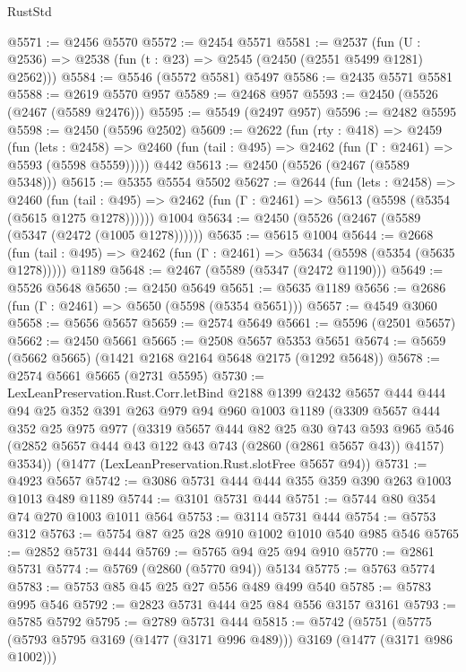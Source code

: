 \begin{lexlean}{RustStd}
\begin{coremodule}
@5571 := @2456 @5570
@5572 := @2454 @5571
@5581 := @2537 (fun (U : @2536) => @2538 (fun (t : @23) => @2545 (@2450 (@2551 @5499 @1281) @2562)))
@5584 := @5546 (@5572 @5581) @5497
@5586 := @2435 @5571 @5581
@5588 := @2619 @5570 @957
@5589 := @2468 @957
@5593 := @2450 (@5526 (@2467 (@5589 @2476)))
@5595 := @5549 (@2497 @957)
@5596 := @2482 @5595
@5598 := @2450 (@5596 @2502)
@5609 := @2622
    (fun (rty : @418) =>
    @2459
      (fun (lets : @2458) =>
      @2460 (fun (tail : @495) => @2462 (fun (Γ : @2461) => @5593 (@5598 @5559)))))
    @442
@5613 := @2450 (@5526 (@2467 (@5589 @5348)))
@5615 := @5355 @5554 @5502
@5627 := @2644
    (fun (lets : @2458) =>
    @2460
      (fun (tail : @495) => @2462 (fun (Γ : @2461) => @5613 (@5598 (@5354 (@5615 @1275 @1278))))))
    @1004
@5634 := @2450 (@5526 (@2467 (@5589 (@5347 (@2472 (@1005 @1278))))))
@5635 := @5615 @1004
@5644 := @2668
    (fun (tail : @495) => @2462 (fun (Γ : @2461) => @5634 (@5598 (@5354 (@5635 @1278)))))
    @1189
@5648 := @2467 (@5589 (@5347 (@2472 @1190)))
@5649 := @5526 @5648
@5650 := @2450 @5649
@5651 := @5635 @1189
@5656 := @2686 (fun (Γ : @2461) => @5650 (@5598 (@5354 @5651)))
@5657 := @4549 @3060
@5658 := @5656 @5657
@5659 := @2574 @5649
@5661 := @5596 (@2501 @5657)
@5662 := @2450 @5661
@5665 := @2508 @5657 @5353 @5651
@5674 := @5659 (@5662 @5665) (@1421 @2168 @2164 @5648 @2175 (@1292 @5648))
@5678 := @2574 @5661 @5665 (@2731 @5595)
@5730 := LexLeanPreservation.Rust.Corr.letBind
    @2188
    @1399
    @2432
    @5657
    @444
    @444
    @94
    @25
    @352
    @391
    @263
    @979
    @94
    @960
    @1003
    @1189
    (@3309
      @5657
      @444
      @352
      @25
      @975
      @977
      (@3319
        @5657
        @444
        @82
        @25
        @30
        @743
        @593
        @965
        @546
        (@2852 @5657 @444 @43 @122 @43 @743 (@2860 (@2861 @5657 @43)) @4157)
        @3534))
    (@1477 (LexLeanPreservation.Rust.slotFree @5657 @94))
@5731 := @4923 @5657
@5742 := @3086 @5731 @444 @444 @355 @359 @390 @263 @1003 @1013 @489 @1189
@5744 := @3101 @5731 @444
@5751 := @5744 @80 @354 @74 @270 @1003 @1011 @564
@5753 := @3114 @5731 @444
@5754 := @5753 @312
@5763 := @5754 @87 @25 @28 @910 @1002 @1010 @540 @985 @546
@5765 := @2852 @5731 @444
@5769 := @5765 @94 @25 @94 @910
@5770 := @2861 @5731
@5774 := @5769 (@2860 (@5770 @94)) @5134
@5775 := @5763 @5774
@5783 := @5753 @85 @45 @25 @27 @556 @489 @499 @540
@5785 := @5783 @995 @546
@5792 := @2823 @5731 @444 @25 @84 @556 @3157 @3161
@5793 := @5785 @5792
@5795 := @2789 @5731 @444
@5815 := @5742
    (@5751
      (@5775 (@5793 @5795 @3169 (@1477 (@3171 @996 @489))) @3169 (@1477 (@3171 @986 @1002)))

\end{coremodule}
\end{lexlean}
